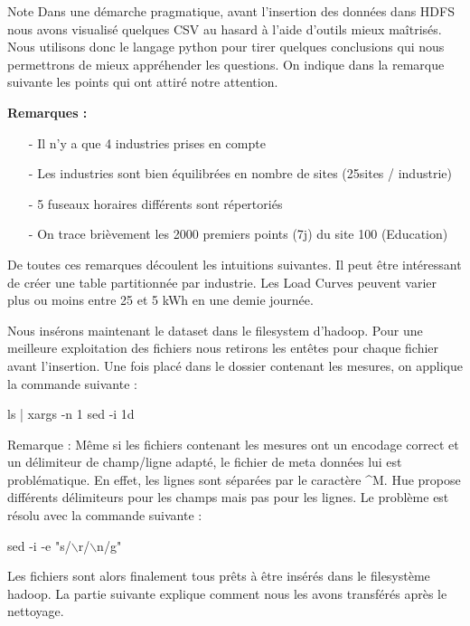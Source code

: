 \begin{block}{Note} Dans une démarche pragmatique, avant l'insertion des données dans HDFS nous avons visualisé quelques CSV au hasard à l’aide d’outils mieux maîtrisés. Nous utilisons donc le langage python pour tirer quelques conclusions qui nous permettrons de mieux appréhender les questions. On indique dans la remarque suivante les points qui ont attiré notre attention. \end{block}

\textbf{Remarques :}
\begin{itemize}
\item[-] Il n’y a que 4 industries prises en compte
\item[-] Les industries sont bien équilibrées en nombre de sites (25sites / industrie)
\item[-] 5 fuseaux horaires différents sont répertoriés
\item[-] On trace brièvement les 2000 premiers points (7j) du site 100 (Education)
\end{itemize}

\par De toutes ces remarques découlent les intuitions suivantes. Il peut être intéressant de créer une table partitionnée par industrie. Les Load Curves peuvent varier plus ou moins entre 25 et 5 kWh en une demie journée.

\par Nous insérons maintenant le dataset dans le filesystem d’hadoop. Pour une meilleure exploitation des fichiers nous retirons les entêtes pour chaque fichier avant l’insertion. Une fois placé dans le dossier contenant les mesures, on applique la commande suivante :
\begin{unix}{ls | xargs -n 1 sed -i 1d}\end{unix}
Remarque : Même si les fichiers contenant les mesures ont un encodage correct et un délimiteur de champ/ligne
adapté, le fichier de meta données lui est problématique. En effet, les lignes sont séparées par le caractère \^{}M.
Hue propose différents délimiteurs pour les champs mais pas pour les lignes. Le problème est résolu avec la
commande suivante :
\begin{unix}{sed -i -e "s/$\backslash$r/$\backslash$n/g"}\end{unix}

Les fichiers sont alors finalement tous prêts à être insérés dans le filesystème hadoop. La partie suivante explique comment nous les avons transférés après le nettoyage. \newpage

